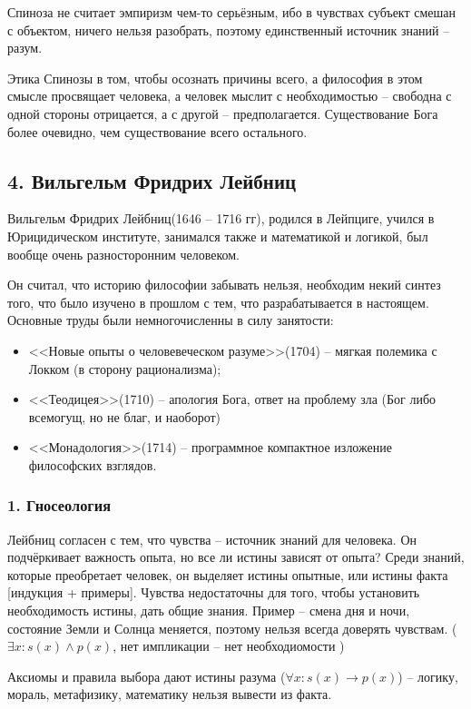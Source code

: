 \documentclass[a4paper, 12pt]{book} %
\begin{document}
Спиноза не считает эмпиризм чем-то серьёзным, ибо в чувствах субъект смешан с объектом, ничего нельзя разобрать, поэтому единственный источник знаний -- разум. 

Этика Спинозы в том, чтобы осознать причины всего, а философия в этом смысле просвящает человека, а человек мыслит с необходимостью -- свободна с одной стороны отрицается, а с другой -- предполагается. Существование Бога более очевидно, чем существование всего остального.

\subsection*{4. Вильгельм Фридрих Лейбниц}
Вильгельм Фридрих Лейбниц(1646 -- 1716 гг), родился в Лейпциге, учился в Юрицидическом институте, занимался также и математикой и логикой, был вообще очень разносторонним человеком.

Он считал, что историю философии забывать нельзя, необходим некий синтез того, что было изучено в прошлом с тем, что разрабатывается в настоящем.
Основные труды были немногочисленны в силу занятости:
\begin{itemize}
\item <<Новые опыты о человевеческом разуме>>(1704) -- мягкая полемика с Локком (в сторону рационализма);
\item <<Теодицея>>(1710) -- апология Бога, ответ на проблему зла (Бог либо всемогущ, но не благ, и наоборот)
\item <<Монадология>>(1714) -- программное компактное изложение философских взглядов.
\end{itemize}  

\subsubsection*{1. Гносеология}
Лейбниц согласен с тем, что чувства -- источник знаний для человека.
Он подчёркивает важность опыта, но все ли истины зависят от опыта? Среди знаний, которые преобретает человек, он выделяет истины опытные, или истины факта [индукция + примеры]. Чувства недостаточны для того, чтобы установить необходимость истины, дать общие знания. Пример -- смена дня и ночи, состояние Земли и Солнца меняется, поэтому нельзя всегда доверять чувствам. ($\exists x: s(x) \wedge p(x)$, нет импликации -- нет необходиомости )

Аксиомы и правила выбора дают истины разума ($\forall x: s(x) \rightarrow p(x)$) -- логику, мораль, метафизику, математику нельзя вывести из факта.
\end{document}
